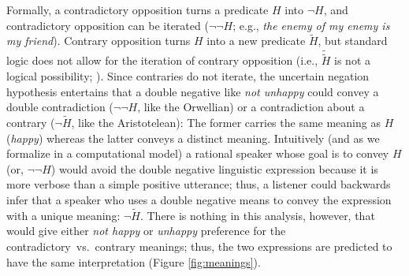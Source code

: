 \documentclass[floatsintext,doc]{apa6}
\begin{document}
Formally, a contradictory opposition turns a predicate $H$ into $\neg H$, and contradictory opposition can be iterated ($\neg \neg H$; e.g., \emph{the enemy of my enemy is my friend}).
Contrary opposition turns $H$ into a new predicate $\tilde{H}$, but standard logic does not allow for the iteration of contrary opposition (i.e., $\tilde{\tilde{H}}$ is not a logical possibility;  ).
Since contraries do not iterate, the uncertain negation hypothesis entertains that a double negative like \emph{not unhappy} could convey a double contradiction ($\neg \neg H$, like the Orwellian) or a contradiction about a contrary ($\neg \tilde{H}$, like the Aristotelean): The former carries the same meaning as $H$ (\emph{happy}) whereas the latter conveys a distinct meaning. 
Intuitively (and as we formalize in a computational model) a rational speaker whose goal is to convey $H$ (or, $\neg \neg H$) would avoid the double negative linguistic expression because it is more verbose than a simple positive utterance; thus, a listener could backwards infer that a speaker who uses a double negative means to convey the expression with a unique meaning: $\neg \tilde{H}$.
There is nothing in this analysis, however, that would give either \emph{not happy} or \emph{unhappy} preference for the contradictory~vs.~contrary meanings; thus, the two expressions are predicted to have the same interpretation (Figure \ref{fig:meanings}).



\end{document}
